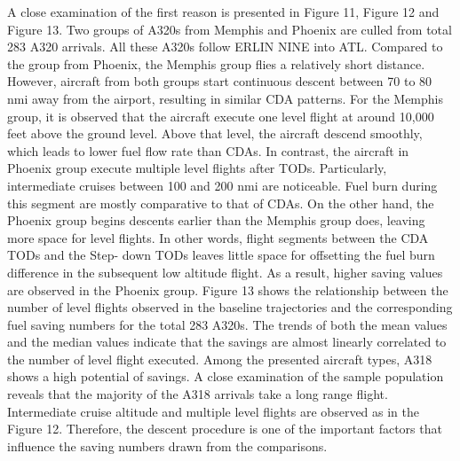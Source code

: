 \documentclass{aer1315-pretty}
\begin{document}
\begin{itemize}
A close examination of the first reason is presented in Figure 11, Figure 12 and Figure
13. Two groups of A320s from Memphis and Phoenix are culled from total 283 A320 arrivals.
All these A320s follow ERLIN NINE into ATL. Compared to the group from Phoenix, the
Memphis group flies a relatively short distance. However, aircraft from both groups start
continuous descent between 70 to 80 nmi away from the airport, resulting in similar CDA
patterns. For the Memphis group, it is observed that the aircraft execute one level flight at around
10,000 feet above the ground level. Above that level, the aircraft descend smoothly, which leads
to lower fuel flow rate than CDAs. In contrast, the aircraft in Phoenix group execute multiple
level flights after TODs. Particularly, intermediate cruises between 100 and 200 nmi are
noticeable. Fuel burn during this segment are mostly comparative to that of CDAs. On the other
hand, the Phoenix group begins descents earlier than the Memphis group does, leaving more
space for level flights. In other words, flight segments between the CDA TODs and the Step-
down TODs leaves little space for offsetting the fuel burn difference in the subsequent low
altitude flight. As a result, higher saving values are observed in the Phoenix group. Figure 13
shows the relationship between the number of level flights observed in the baseline trajectories
and the corresponding fuel saving numbers for the total 283 A320s. The trends of both the mean
values and the median values indicate that the savings are almost linearly correlated to the
number of level flight executed.
Among the presented aircraft types, A318 shows a high potential of savings. A close
examination of the sample population reveals that the majority of the A318 arrivals take a long
range flight. Intermediate cruise altitude and multiple level flights are observed as in the Figure
12. Therefore, the descent procedure is one of the important factors that influence the saving
numbers drawn from the comparisons.



\end{itemize}
\end{document}
